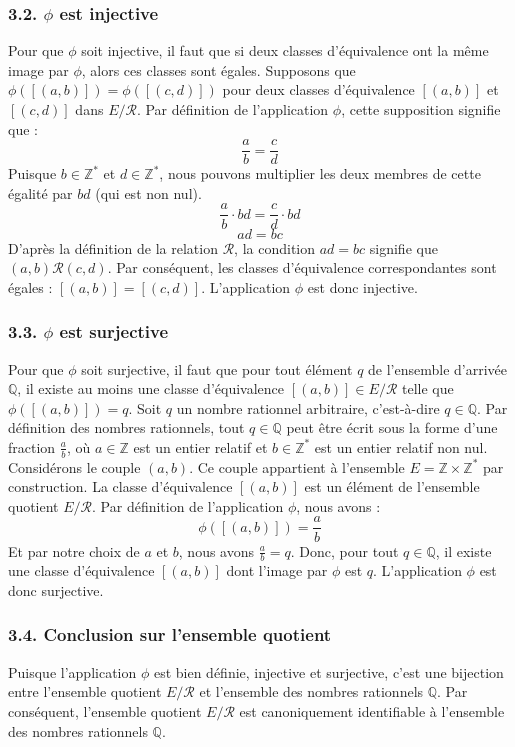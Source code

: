 \documentclass{report}
\begin{document}
\subsubsection*{3.2. $\phi$ est injective}
Pour que $\phi$ soit injective, il faut que si deux classes d'équivalence ont la même image par $\phi$, alors ces classes sont égales.
Supposons que $\phi([(a,b)]) = \phi([(c,d)])$ pour deux classes d'équivalence $[(a,b)]$ et $[(c,d)]$ dans $E/\mathcal{R}$.
Par définition de l'application $\phi$, cette supposition signifie que :
$$ \frac{a}{b} = \frac{c}{d} $$
Puisque $b \in \mathbb{Z}^*$ et $d \in \mathbb{Z}^*$, nous pouvons multiplier les deux membres de cette égalité par $bd$ (qui est non nul).
$$ \frac{a}{b} \cdot bd = \frac{c}{d} \cdot bd $$
$$ ad = bc $$
D'après la définition de la relation $\mathcal{R}$, la condition $ad = bc$ signifie que $(a,b) \mathcal{R} (c,d)$.
Par conséquent, les classes d'équivalence correspondantes sont égales : $[(a,b)] = [(c,d)]$.
L'application $\phi$ est donc injective.

\subsubsection*{3.3. $\phi$ est surjective}
Pour que $\phi$ soit surjective, il faut que pour tout élément $q$ de l'ensemble d'arrivée $\mathbb{Q}$, il existe au moins une classe d'équivalence $[(a,b)] \in E/\mathcal{R}$ telle que $\phi([(a,b)]) = q$.
Soit $q$ un nombre rationnel arbitraire, c'est-à-dire $q \in \mathbb{Q}$.
Par définition des nombres rationnels, tout $q \in \mathbb{Q}$ peut être écrit sous la forme d'une fraction $\frac{a}{b}$, où $a \in \mathbb{Z}$ est un entier relatif et $b \in \mathbb{Z}^*$ est un entier relatif non nul.
Considérons le couple $(a,b)$. Ce couple appartient à l'ensemble $E = \mathbb{Z} \times \mathbb{Z}^*$ par construction.
La classe d'équivalence $[(a,b)]$ est un élément de l'ensemble quotient $E/\mathcal{R}$.
Par définition de l'application $\phi$, nous avons :
$$ \phi([(a,b)]) = \frac{a}{b} $$
Et par notre choix de $a$ et $b$, nous avons $\frac{a}{b} = q$.
Donc, pour tout $q \in \mathbb{Q}$, il existe une classe d'équivalence $[(a,b)]$ dont l'image par $\phi$ est $q$.
L'application $\phi$ est donc surjective.

\subsubsection*{3.4. Conclusion sur l'ensemble quotient}
Puisque l'application $\phi$ est bien définie, injective et surjective, c'est une bijection entre l'ensemble quotient $E/\mathcal{R}$ et l'ensemble des nombres rationnels $\mathbb{Q}$.
Par conséquent, l'ensemble quotient $E/\mathcal{R}$ est canoniquement identifiable à l'ensemble des nombres rationnels $\mathbb{Q}$.
\end{document}

